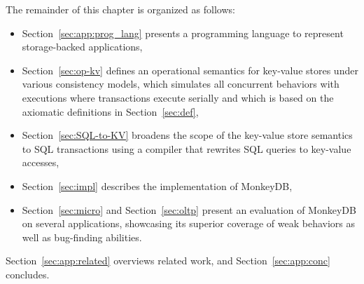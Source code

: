 
The remainder of this chapter is organized as follows:
\begin{itemize}
\item Section~\ref{sec:app:prog_lang} presents a programming language to represent storage-backed applications,
\item Section~\ref{sec:op-kv} defines an operational semantics for key-value stores under various
  consistency models, which simulates all concurrent behaviors with executions
  where transactions execute serially and which is based 
  on the axiomatic definitions in Section~\ref{sec:def},
\item Section~\ref{sec:SQL-to-KV} broadens the scope of the key-value store semantics to SQL transactions
  using a compiler that rewrites SQL queries to key-value accesses,
\item Section~\ref{sec:impl} describes the implementation of MonkeyDB,
\item Section~\ref{sec:micro} and Section~\ref{sec:oltp} present an evaluation of MonkeyDB on several applications, showcasing
its superior coverage of weak behaviors as well as bug-finding abilities.
\end{itemize}
Section~\ref{sec:app:related} overviews related work, and Section~\ref{sec:app:conc} concludes.


 


 



